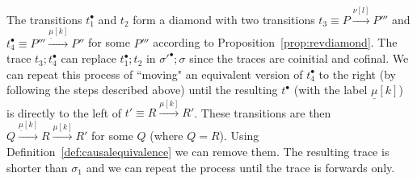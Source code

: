 \begin{subappendices}
\begin{pf}
The transitions $t_1^\bullet$ and $t_2$ form a diamond with two transitions $t_3 \equiv P \xrightarrow{\nu[l]} P'''$ and $t_4^\bullet \equiv P''' \xrightarrow{\underline{\mu}[k]} P''$ for some $P'''$ according to Proposition~\ref{prop:revdiamond}. The trace $t_3;t_4^{\bullet}$ can replace $t_1^\bullet;t_2$ in $\sigma'^\bullet;\sigma$ since the traces are coinitial and cofinal. We can repeat this process of ``moving" an equivalent version of $t_4^\bullet$ to the right (by following the steps described above) until the resulting $t^\bullet$ (with the label $\underline{\mu}[k]$) is directly to the left of $t' \equiv R \xrightarrow{\mu[k]} R'$. These transitions are then $Q \xrightarrow{\underline{\mu}[k]}R \xrightarrow{\mu[k]} R'$ for some $Q$ (where $Q=R$). Using Definition~\ref{def:causalequivalence} we can remove them. The resulting trace is shorter than $\sigma_1$ and we can repeat the process until the trace is forwards only.
\end{pf}

\end{subappendices}

